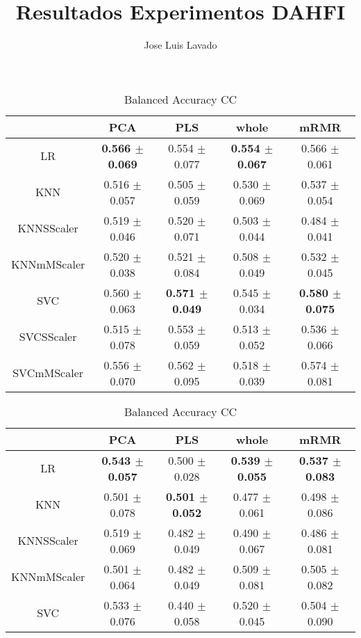 \documentclass[]{report}
\title{Resultados Experimentos DAHFI}
\author{Jose Luis Lavado}
\begin{document}
\maketitle

	\begin{table}
		\centering
		\setlength{\aboverulesep}{0pt}
		\setlength{\belowrulesep}{0pt}
		\begin{tabular}{c|cccc}
			\hline
			             & PCA             & PLS             & whole           & mRMR            \\
			\hline
			 LR          & \textbf{0.566 $\pm$ 0.069} & 0.554 $\pm$ 0.077 & \textbf{0.554 $\pm$ 0.067} & 0.566 $\pm$ 0.061 \\
			 KNN         & 0.516 $\pm$ 0.057 & 0.505 $\pm$ 0.059 & 0.530 $\pm$ 0.069 & 0.537 $\pm$ 0.054 \\
			 KNNSScaler  & 0.519 $\pm$ 0.046 & 0.520 $\pm$ 0.071 & 0.503 $\pm$ 0.044 & 0.484 $\pm$ 0.041 \\
			 KNNmMScaler & 0.520 $\pm$ 0.038 & 0.521 $\pm$ 0.084 & 0.508 $\pm$ 0.049 & 0.532 $\pm$ 0.045 \\
			 SVC         & 0.560 $\pm$ 0.063 & \textbf{0.571 $\pm$ 0.049} & 0.545 $\pm$ 0.034 & \textbf{0.580 $\pm$ 0.075} \\
			 SVCSScaler  & 0.515 $\pm$ 0.078 & 0.553 $\pm$ 0.059 & 0.513 $\pm$ 0.052 & 0.536 $\pm$ 0.066 \\
			 SVCmMScaler & 0.556 $\pm$ 0.070 & 0.562 $\pm$ 0.095 & 0.518 $\pm$ 0.039 & 0.574 $\pm$ 0.081 \\
			\hline
		\end{tabular}
		\caption{\label{tab:bal_acc_CC} Balanced Accuracy CC}
		\vspace*{2cm}
		\begin{tabular}{c|cccc}
			\hline
			             & PCA             & PLS             & whole           & mRMR            \\
			\hline
			 LR          & \textbf{0.543 $\pm$ 0.057} & 0.500 $\pm$ 0.028 & \textbf{0.539 $\pm$ 0.055} & \textbf{0.537 $\pm$ 0.083} \\
			 KNN         & 0.501 $\pm$ 0.078 & \textbf{0.501 $\pm$ 0.052} & 0.477 $\pm$ 0.061 & 0.498 $\pm$ 0.086 \\
			 KNNSScaler  & 0.519 $\pm$ 0.069 & 0.482 $\pm$ 0.049 & 0.490 $\pm$ 0.067 & 0.486 $\pm$ 0.081 \\
			 KNNmMScaler & 0.501 $\pm$ 0.064 & 0.482 $\pm$ 0.049 & 0.509 $\pm$ 0.081 & 0.505 $\pm$ 0.082 \\
			 SVC         & 0.533 $\pm$ 0.076 & 0.440 $\pm$ 0.058 & 0.520 $\pm$ 0.045 & 0.504 $\pm$ 0.090 \\

\end{tabular}
\end{table}
\end{document}
